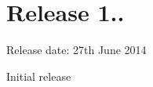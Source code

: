 \hypertarget{_release_log_Release}{}\section{Release 1..}\label{_release_log_Release}

\begin{DoxyItemize}
\item Release date\+: 27th June 2014
\item Initial release 
\end{DoxyItemize}